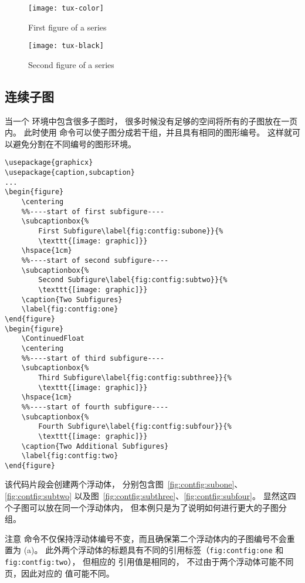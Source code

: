 \begin{figure}[tbp]
	\ContinuedFloat*
	\centering
	\texttt{[image: tux-color]}
	\caption{First figure of a series}
	\label{fig:continued:first}
\end{figure}

\begin{figure}[tbp]
	\ContinuedFloat
	\centering
	\texttt{[image: tux-black]}
	\caption{Second figure of a series}
	\label{fig:continued:second}
\end{figure}

\subsection{连续子图}

当一个  环境中包含很多子图时，
很多时候没有足够的空间将所有的子图放在一页内。
此时使用  命令可以使子图分成若干组，并且具有相同的图形编号。
这样就可以避免分割在不同编号的图形环境。

\begin{lstlisting}
\usepackage{graphicx}
\usepackage{caption,subcaption}
...
\begin{figure}
	\centering
	%%----start of first subfigure----
	\subcaptionbox{%
		First Subfigure\label{fig:contfig:subone}}{%
		\texttt{[image: graphic]}}
	\hspace{1cm}
	%%----start of second subfigure----
	\subcaptionbox{%
		Second Subfigure\label{fig:contfig:subtwo}}{%
		\texttt{[image: graphic]}}
	\caption{Two Subfigures}
	\label{fig:contfig:one}
\end{figure}
\begin{figure}
	\ContinuedFloat
	\centering
	%%----start of third subfigure----
	\subcaptionbox{%
		Third Subfigure\label{fig:contfig:subthree}}{%
		\texttt{[image: graphic]}}
	\hspace{1cm}
	%%----start of fourth subfigure----
	\subcaptionbox{%
		Fourth Subfigure\label{fig:contfig:subfour}}{%
		\texttt{[image: graphic]}}
	\caption{Two Additional Subfigures}
	\label{fig:contfig:two}
\end{figure}
\end{lstlisting}
该代码片段会创建两个浮动体，
分别包含图~\ref{fig:contfig:subone}、\ref{fig:contfig:subtwo} 
以及图~\ref{fig:contfig:subthree}、\ref{fig:contfig:subfour}。
显然这四个子图可以放在同一个浮动体内，
但本例只是为了说明如何进行更大的子图分组。

注意  命令不仅保持浮动体编号不变，而且确保第二个浮动体内的子图编号不会重置为 (a)。
此外两个浮动体的标题具有不同的引用标签（\texttt{fig:contfig:one} 和 \texttt{fig:contfig:two}），
但相应的  引用值是相同的，
不过由于两个浮动体可能不同页，因此对应的  值可能不同。

